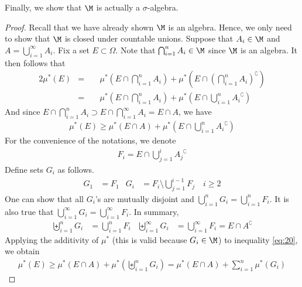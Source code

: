 \documentclass[thmcnt=section, 12pt]{elegantbook}
\begin{document}
\par Finally, we show that $ \M $ is actually a $ \sigma $-algebra. 
\begin{proof}
    Recall that we have already shown $ \M $ is an algebra. Hence, we only need to show that $ \M $ is closed under countable unions. Suppose that $ A_i \in \M $ and $ A = \bigcup_{i=1}^\infty {A_i} $. Fix a set $ E \subset \Omega $. Note that $ \bigcap_{i=1}^n {A_i} \in \M $ since $ \M $ is an algebra. It then follows that 
    \begin{alignat*}{2}
        \mu^\ast(E)
        &=& \; & \mu^\ast\left( E \cap \bigcap_{i=1}^n {A_i} \right) + \mu^\ast\left( E \cap \left(\bigcap_{i=1}^n {A_i}\right)^\complement \right) \\
        &=&& \mu^\ast\left( E \cap \bigcap_{i=1}^n {A_i} \right) + \mu^\ast \left( E \cap \bigcup_{i=1}^n {{A_i}^\complement} \right)
    \end{alignat*}
    And since $ E \cap \bigcap_{i=1}^n {A_i} \supset E \cap \bigcap_{i=1}^\infty {A_i} = E \cap A $, we have 
    \begin{align}
        \mu^\ast(E) \geq \mu^\ast(E \cap A) + \mu^\ast\left( E \cap \bigcup_{i=1}^n {{A_i}^\complement} \right) \label{eq:20}
    \end{align}
    For the convenience of the notations, we denote
    \begin{align*}
        F_i = E \cap \bigcup_{j=1}^i {{A_j}^\complement}
    \end{align*}
    Define sets $ G_i $ as follows.
    \begin{align*}
        G_1 &= F_1 & G_i &= F_i \setminus \bigcup_{j=1}^{i-1} {F_j} \quad  i \geq 2
    \end{align*}
    One can show that all $ G_i $'s are mutually disjoint and $ \bigcup_{i=1}^n {G_i} = \bigcup_{i=1}^n {F_i} $. It is also true that $ \bigcup_{i=1}^\infty {G_i} = \bigcup_{i=1}^\infty {F_i} $. In summary,
    \begin{align*}
        \biguplus_{i=1}^n {G_i} &= \bigcup_{i=1}^n {F_i} & \biguplus_{i=1}^\infty {G_i} &= \bigcup_{i=1}^\infty {F_i} = E \cap A^\complement
    \end{align*}
    Applying the additivity of $ \mu^\ast $ (this is valid because $ G_i \in \M $) to inequality \eqref{eq:20}, we obtain
    \begin{align*}
        \mu^\ast(E) \geq \mu^\ast(E \cap A) + \mu^\ast\left(\biguplus_{i=1}^n G_i\right) = \mu^\ast(E \cap A) + \sum_{i=1}^n {\mu^\ast(G_i)}
    \end{align*}

\end{proof}
\end{document}
